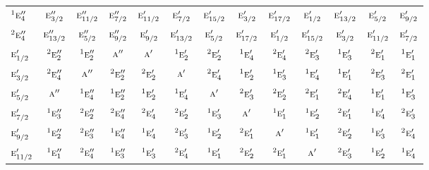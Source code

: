 \documentclass[10pt,a4paper]{article}
\numberwithin{equation}{section}
\newcommand{\irr}[1]{\text{\normalfont\scshape #1}}
\newcommand{\conjpair}[1]{{}^{#1}}
\begin{document}
{\begin{longtable}{@{}lcccccccccccc@{}}
$\conjpair{1}\irr{e}_{4}''$ & $\irr{e}_{3/2}''$ & $\irr{e}_{11/2}''$ & $\irr{e}_{7/2}''$ & $\irr{e}_{11/2}'$ & $\irr{e}_{7/2}'$ & $\irr{e}_{15/2}'$ & $\irr{e}_{3/2}'$ & $\irr{e}_{17/2}'$ & $\irr{e}_{1/2}'$ & $\irr{e}_{13/2}'$ & $\irr{e}_{5/2}'$ & $\irr{e}_{9/2}'$\\
$\conjpair{2}\irr{e}_{4}''$ & $\irr{e}_{13/2}''$ & $\irr{e}_{5/2}''$ & $\irr{e}_{9/2}''$ & $\irr{e}_{9/2}'$ & $\irr{e}_{13/2}'$ & $\irr{e}_{5/2}'$ & $\irr{e}_{17/2}'$ & $\irr{e}_{1/2}'$ & $\irr{e}_{15/2}'$ & $\irr{e}_{3/2}'$ & $\irr{e}_{11/2}'$ & $\irr{e}_{7/2}'$\\
$\irr{e}_{1/2}'$ & $\conjpair{2}\irr{e}_{2}''$ & $\conjpair{1}\irr{e}_{2}''$ & $\irr{a}''$ & $\irr{a}'$ & $\conjpair{1}\irr{e}_{2}'$ & $\conjpair{2}\irr{e}_{2}'$ & $\conjpair{1}\irr{e}_{4}'$ & $\conjpair{2}\irr{e}_{4}'$ & $\conjpair{2}\irr{e}_{3}'$ & $\conjpair{1}\irr{e}_{3}'$ & $\conjpair{2}\irr{e}_{1}'$ & $\conjpair{1}\irr{e}_{1}'$\\
$\irr{e}_{3/2}'$ & $\conjpair{2}\irr{e}_{4}''$ & $\irr{a}''$ & $\conjpair{2}\irr{e}_{2}''$ & $\conjpair{2}\irr{e}_{2}'$ & $\irr{a}'$ & $\conjpair{2}\irr{e}_{4}'$ & $\conjpair{1}\irr{e}_{2}'$ & $\conjpair{1}\irr{e}_{3}'$ & $\conjpair{1}\irr{e}_{4}'$ & $\conjpair{1}\irr{e}_{1}'$ & $\conjpair{2}\irr{e}_{3}'$ & $\conjpair{2}\irr{e}_{1}'$\\
$\irr{e}_{5/2}'$ & $\irr{a}''$ & $\conjpair{1}\irr{e}_{4}''$ & $\conjpair{1}\irr{e}_{2}''$ & $\conjpair{1}\irr{e}_{2}'$ & $\conjpair{1}\irr{e}_{4}'$ & $\irr{a}'$ & $\conjpair{2}\irr{e}_{3}'$ & $\conjpair{2}\irr{e}_{2}'$ & $\conjpair{2}\irr{e}_{1}'$ & $\conjpair{2}\irr{e}_{4}'$ & $\conjpair{1}\irr{e}_{1}'$ & $\conjpair{1}\irr{e}_{3}'$\\
$\irr{e}_{7/2}'$ & $\conjpair{1}\irr{e}_{3}''$ & $\conjpair{2}\irr{e}_{2}''$ & $\conjpair{2}\irr{e}_{4}''$ & $\conjpair{2}\irr{e}_{4}'$ & $\conjpair{2}\irr{e}_{2}'$ & $\conjpair{1}\irr{e}_{3}'$ & $\irr{a}'$ & $\conjpair{1}\irr{e}_{1}'$ & $\conjpair{1}\irr{e}_{2}'$ & $\conjpair{2}\irr{e}_{1}'$ & $\conjpair{1}\irr{e}_{4}'$ & $\conjpair{2}\irr{e}_{3}'$\\
$\irr{e}_{9/2}'$ & $\conjpair{1}\irr{e}_{2}''$ & $\conjpair{2}\irr{e}_{3}''$ & $\conjpair{1}\irr{e}_{4}''$ & $\conjpair{1}\irr{e}_{4}'$ & $\conjpair{2}\irr{e}_{3}'$ & $\conjpair{1}\irr{e}_{2}'$ & $\conjpair{2}\irr{e}_{1}'$ & $\irr{a}'$ & $\conjpair{1}\irr{e}_{1}'$ & $\conjpair{2}\irr{e}_{2}'$ & $\conjpair{1}\irr{e}_{3}'$ & $\conjpair{2}\irr{e}_{4}'$\\
$\irr{e}_{11/2}'$ & $\conjpair{1}\irr{e}_{1}''$ & $\conjpair{2}\irr{e}_{4}''$ & $\conjpair{1}\irr{e}_{3}''$ & $\conjpair{1}\irr{e}_{3}'$ & $\conjpair{2}\irr{e}_{4}'$ & $\conjpair{1}\irr{e}_{1}'$ & $\conjpair{2}\irr{e}_{2}'$ & $\conjpair{2}\irr{e}_{1}'$ & $\irr{a}'$ & $\conjpair{2}\irr{e}_{3}'$ & $\conjpair{1}\irr{e}_{2}'$ & $\conjpair{1}\irr{e}_{4}'$\\

\end{longtable}}
\end{document}
